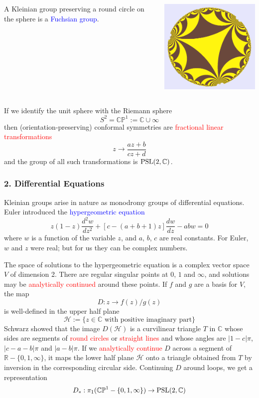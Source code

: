 \documentclass{beamer}
\def\R{\mathbb{R}}
\def\HH{\mathcal{H}}
\def\CP{\mathbb{CP}}
\def\C{\mathbb{C}}
\def\PSL{\textnormal{PSL}}
\begin{document}
\frame
{
\begin{columns}[c]
\column{1.1in}
A Kleinian group 
preserving a round circle
on the sphere is a
\textcolor{blue}{Fuchsian group}.
\column{3in}
\begin{center}
\includegraphics[width=3in]{fuchsian.png}
\end{center}
\end{columns}
}
\frame
{
If we identify the unit sphere with the \textcolor{dgreen}{Riemann sphere} 
$$S^2 = \CP^1:=\C\cup \infty$$
then (orientation-preserving) conformal symmetries are \textcolor{red}{fractional linear
transformations}
$$z \to \frac {az+b} {cz+d}$$
and the group of all such transformations is $\PSL(2,\C)$.
}
\frame
{
\frametitle{2. Differential Equations}

Kleinian groups arise in nature as monodromy groups of \textcolor{dgreen}{differential equations}.
\vskip 5pt
Euler introduced the \textcolor{blue}{hypergeometric equation}
$$z(1-z)\frac {d^2w}{dz^2} + [c - (a+b+1)z]\frac {dw}{dz} - abw = 0$$
where $w$ is a function of the variable $z$, and $a$, $b$, $c$ are real constants.
\vskip 10pt
For Euler, $w$ and $z$ were real; but for us they can be complex numbers.
}
\frame
{The space of solutions to the hypergeometric equation
is a complex vector space $V$ of dimension 2. 
\vskip 10pt
There are \textcolor{dgreen}{regular singular points}
at $0$, $1$ and $\infty$, and solutions may be \textcolor{red}{analytically continued} 
around these points.
\vskip 10pt
If $f$ and $g$ are a basis for $V$, the map $$D:z \to f(z)/g(z)$$ is well-defined
in the \textcolor{dgreen}{upper half plane}
$$\HH:=\lbrace z \in \C \text{ with positive imaginary part} \rbrace$$
}
\frame
{
Schwarz showed that the image $D(\HH)$ is a \textcolor{dgreen}{curvilinear triangle} $T$ in $\C$
whose sides are segments of \textcolor{red}{round circles} or \textcolor{red}{straight lines}
and whose angles are $|1-c|\pi$, $|c-a-b|\pi$ and $|a-b|\pi$.
\vskip 10pt
If we \textcolor{red}{analytically continue} $D$ across a segment of 
$\R - \lbrace 0,1,\infty\rbrace$, it maps
the lower half plane $\overline{\HH}$ onto a triangle obtained from $T$ by \textcolor{dgreen}{inversion}
in the corresponding circular side. 
\vskip 10pt
Continuing $D$ around loops, we get a
representation 
$$D_*:\pi_1(\CP^1 - \lbrace 0,1,\infty\rbrace) \to \PSL(2,\C)$$ 
}
\end{document}
